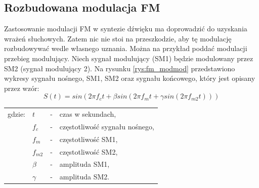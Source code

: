 \subsection{Rozbudowana modulacja FM}
Zastosowanie modulacji FM w syntezie dźwięku ma doprowadzić do uzyskania wrażeń słuchowych. Zatem nic nie stoi na przeszkodzie, aby tę modulację rozbudowywać wedle własnego uznania. Można na przykład poddać modulacji przebieg modulujący. Niech sygnał modulujący (SM1) będzie modulowany przez SM2 (sygnał modulujący 2). Na rysunku \ref{rys:fm_modmod} przedstawiono wykresy sygnału nośnego, SM1, SM2 oraz sygnału końcowego, który jest opisany przez wzór:
\begin{equation} \label{equ:fm_modmod}
S(t)= sin(2 \pi f_c t + \beta sin(2 \pi f_m t + \gamma sin(2 \pi f_{m2} t)))
\end{equation}
\begin{tabular}{ l l l l}
	gdzie: & $t$ &  - & czas w sekundach, \\
	&	$f_c$ & - &  częstotliwość sygnału nośnego,\\
	&	$f_m$ & - &  częstotliwość SM1,\\
	&	$f_{m2}$ & - &  częstotliwość SM2,\\
	&	$\beta$ & - & amplituda SM1,\\
	&	$\gamma$ & - & amplituda SM2.\\
\end{tabular} \\ \\

